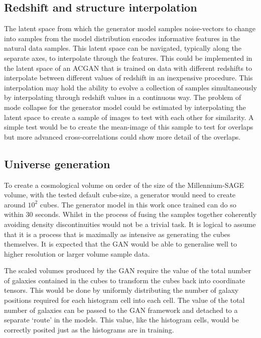 \documentclass[twocolumn]{article}
\numberwithin{equation}{section}
\begin{document}

\subsection{Redshift and structure interpolation} The latent space from which the generator model samples noise-vectors
to change into samples from the model distribution encodes informative features in the natural data samples. This latent
space can be navigated, typically along the separate axes, to interpolate through the features. This could be implemented
in the latent space of an ACGAN that is trained on data with different redshifts to interpolate between different values
of redshift in an inexpensive procedure. This interpolation may hold the ability to evolve a collection of samples 
simultaneously by interpolating through redshift values in a continuous way. The problem of mode collapse for the 
generator model could be estimated by interpolating the latent space to create a sample of images to test with each other
for similarity. A simple test would be to create the mean-image of this sample to test for overlaps but more advanced 
cross-correlations could show more detail of the overlaps.  

\subsection{Universe generation} To create a cosmological volume on order of the size of the Millennium-SAGE volume, with 
the tested default cube-size, a generator would need to create around $10^2$ cubes. The generator model in this work once
trained can do so within 30 seconds. Whilst in the process of fusing the samples together coherently avoiding density 
discontinuities would not be a trivial task. It is logical to assume that it is a process that is maximally as intensive 
as generating the cubes themselves. It is expected that the GAN would be able to generalise well to higher resolution or 
larger volume sample data.  

The scaled volumes produced by the GAN require the value of the total number of galaxies contained in the cubes to 
transform the cubes back into coordinate tensors. This would be done by uniformly distributing the number of galaxy 
positions required for each histogram cell into each cell. The value of the total number of galaxies can be passed to 
the GAN framework and detached to a separate `route' in the models. This value, like the histogram cells, would be 
correctly posited just as the histograms are in training. 
\end{document}

